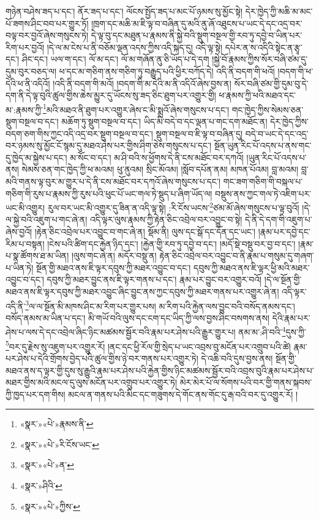 གཉེན་བཤེས་ཟད་པ་དང་། ནོར་ཟད་པ་དང་། ལོངས་སྤྱོད་ཟད་པ་མང་པོ་ཉམས་སུ་མྱོང་སྟེ། དེར་ཁྱེད་ཀྱི་མཆི་མ་མང་པོ་ཟགས་ཤིང་བབ་པར་གྱུར་ཏོ། །ཁྲག་དང་མཆི་མ་ཇི་ལྟ་བ་བཞིན་དུ་མའི་ནུ་ཞོ་འཐུངས་པ་ཡང་དེ་དང་འདྲ་བར་བལྟ་བར་བྱའོ་ཞེས་གསུངས་ཏེ། དེ་ལྟ་བུ་དང་མཐུན་པ་རྣམས་ནི་སྐྱེ་བའི་སྡུག་བསྔལ་གྱི་རབ་ཏུ་དབྱེ་བ་ཡིན་པར་རིག་པར་བྱའོ། །དེ་ལ་མ་ངེས་པ་ནི་བཅོམ་ལྡན་འདས་ཀྱིས་འདི་སྐད་དུ། འདི་ལྟ་སྟེ། དཔེར་ན་ས་འདིའི་སྟེང་ན་རྩྭ་དང་། ཤིང་དང་། ཡལ་ག་དང་། ལོ་མ་དང་། ལོ་མ་གཞོན་ནུ་ཅི་ཡོད་པ་དེ་དག །སྐྱེ་བོ་རྣམས་ཀྱིས་སོར་བཞི་ཙམ་དུ་དུམ་བུར་བཅད་ལ། ཕ་དང་མ་གཅིག་ནས་གཅིག་ཏུ་བརྒྱུད་པའི་ཕྱིར་བཀོད་དེ། འདི་ནི་བདག་གི་ཕའོ། །བདག་གི་ཕ་དེའི་ཕ་ནི་འདིའོ། །འདི་ནི་བདག་གི་མའོ། །བདག་གི་མ་དེའི་མ་ནི་འདིའོ་ཞེས་བྱས་ན། སོར་བཞི་ཙམ་གྱི་དུམ་བུ་དེ་དག་ནི་དེ་ལྟ་བུའི་ཚུལ་གྱིས་ཆེས་མྱུར་དུ་ཡོངས་སུ་ཟད་ཅིང་ཐུག་པར་འགྱུར་གྱི། ཕ་རྣམས་ཀྱི་ཕའི་མཐའ་དང་མ་:རྣམས་ཀྱི་\footnote{«སྣར་»«པེ་»རྣམས་ནི་}མའི་མཐའ་ནི་ཐུག་པར་འགྱུར་ཞེས་ང་མི་སྨྲའོ་ཞེས་གསུངས་པ་དང་། གང་ཁྱེད་ཀྱིས་སེམས་ཅན་སྡུག་བསྔལ་བ་དང་། མཆོག་ཏུ་སྡུག་བསྔལ་བ་དང་། ཡིད་མི་བདེ་བ་དང་ལྡན་པ་གང་དག་མཐོང་ན། དེར་ཁྱེད་ཀྱིས་བདག་ཅག་གིས་ཀྱང་འདི་འདྲ་བར་སྡུག་བསྔལ་བ་དང་། སྡུག་བསྔལ་བ་ཇི་ལྟ་བ་བཞིན་དུ། བདེ་བ་ཡང་དེ་དང་འདྲ་བར་ཉམས་སུ་མྱོང་ངོ་སྙམ་དུ་མཐའ་ཤེས་པར་གྱིས་ཤིག་ཅེས་གསུངས་པ་དང་། སྔོན་ཡུན་རིང་པོ་འདས་པ་ནས་གང་དུ་ཁྱེད་མ་སྐྱེས་པ་དང་། མ་སོང་བ་དང་། མ་ཤི་བའི་ས་ཕྱོགས་དེ་ནི་ངས་མཐོང་བར་དཀའོ། །ཡུན་རིང་པོ་འདས་པ་ནས། སེམས་ཅན་གང་ཁྱེད་ཀྱི་ཕ་མའམ། ཕུ་ནུའམ། སྲིང་མོའམ། །སློབ་དཔོན་ནམ། མཁན་པོའམ། བླ་མའམ། བླ་མའི་གནས་ལྟ་བུར་མ་གྱུར་པ་དེ་ནི་ངས་མཐོང་བར་དཀའོ་ཞེས་གསུངས་པ་དང་། གང་ཟག་གཅིག་གི་བསྐལ་པ་གཅིག་གི་རུས་པ་རྣམས་ཀྱི་རུས་པའི་ཕུང་པོ་ཡང་གལ་ཏེ་སྡུད་པ་ཞིག་ཡོད་ལ། བསྡུས་ནས་ཀྱང་གལ་ཏེ་འཇིག་པར་ཡང་མི་འགྱུར། རུལ་བར་ཡང་མི་འགྱུར་དུ་ཟིན་ན་འདི་ལྟ་སྟེ། :རི་ངོས་ཡངས་\footnote{«སྣར་»«པེ་»རི་ངོས་ཡང་}ཙམ་མོ་ཞེས་གསུངས་པ་ལྟ་བུའོ། །དེ་ལ་སྐྱེ་བའི་འཇུག་པ་གང་ཞེ་ན། འདི་ལྟར་ལུས་རྣམས་ཀྱི་རྟེན་ཅིང་འབྲེལ་བར་འབྱུང་བ་སྟེ། དེ་ནི་དེ་དག་གི་འཇུག་པ་ཞེས་བྱའོ། །རྟེན་ཅིང་འབྲེལ་པར་འབྱུང་བ་གང་ཞེ་ན། སྡོམ་ནི། ལུས་དང་སྒོ་དང་དོན་དང་ཡང་། །རྣམ་པར་དབྱེ་དང་རིམ་པ་བསྟན། །ངེས་པའི་ཚིག་དང་རྐྱེན་ཉིད་དང་། །རྐྱེན་གྱི་རབ་ཏུ་དབྱེ་བ་དང་། །མདོ་སྡེ་བསྡུ་བར་བྱ་བ་དང་། །རྣམ་པ་སྣ་ཚོགས་ཐ་མ་ཡིན། །ལུས་གང་ཞེ་ན། མདོར་བསྡུ་ན། རྟེན་ཅིང་འབྲེལ་བར་འབྱུང་བ་ནི་རྣམ་པ་གསུམ་དུ་གཞག་པ་ཡིན་ཏེ། སྔོན་གྱི་མཐའ་ནས་ཇི་ལྟར་དབུས་ཀྱི་མཐར་འབྱུང་བ་དང་། དབུས་ཀྱི་མཐའ་ནས་ཇི་ལྟར་ཕྱི་མའི་མཐར་འབྱུང་བ་དང་། དབུས་ཀྱི་མཐར་བྱུང་ནས་ཇི་ལྟར་གནས་པ་དང་། རྣམ་པར་བྱུང་བར་འགྱུར་བའོ། །དེ་ལ་སྔོན་གྱི་མཐའ་ནས་ཇི་ལྟར་དབུས་ཀྱི་མཐར་འབྱུང་ཞིང་བྱུང་ནས་ཀྱང་དབུས་ཀྱི་མཐར་གནས་པར་འགྱུར་ཞེ་ན། འདི་ལྟར་འདི་ནི་\footnote{«སྣར་»«པེ་»ན་}ལ་ལ་སྔོན་མི་མཁས་ཤིང་མ་རིག་པར་གྱུར་པས། མ་རིག་པའི་རྐྱེན་ལས་བྱུང་བའི་བསོད་ནམས་དང་། བསོད་ནམས་མ་ཡིན་པ་དང་། མི་གཡོ་བའི་ལུས་དང་ངག་དང་ཡིད་ཀྱི་ལས་བྱས་ཤིང་བསགས་ནས། དེའི་རྣམ་པར་ཤེས་པ་ལས་དེ་དང་འབྲེལ་ཞིང་ཉིང་མཚམས་སྦྱོར་བའི་རྣམ་པར་ཤེས་པའི་རྒྱུར་གྱུར་པ། ནམ་མ་:ཤི་བའི་\footnote{«སྣར་»ཤིའི་}དུས་ཀྱི་\footnote{«སྣར་»«པེ་»ཀྱིས་}བར་དུ་རྗེས་སུ་འཇུག་པར་འགྱུར་རོ། །ནང་དང་ཕྱི་རོལ་གྱི་སྲེད་པ་ཡང་འབྲས་བུ་མངོན་པར་འགྲུབ་པའི་ཚེ། རྣམ་པར་ཤེས་པ་དེའི་གྲོགས་བྱེད་པའི་ཚུལ་གྱིས་ཉེ་བར་གནས་པར་འགྱུར་ཏེ། དེ་འཆི་བའི་དུས་བྱས་ནས། སྔོན་གྱི་མཐའ་ནས་ད་ལྟར་གྱི་དུས་སུ་རྒྱུའི་རྣམ་པར་ཤེས་པའི་རྐྱེན་གྱིས་ཉིང་མཚམས་སྦྱོར་བའི་འབྲས་བུའི་རྣམ་པར་ཤེས་པ་མཐར་གྱིས་མའི་མངལ་དུ་ལུས་མངོན་པར་འགྲུབ་པར་འགྱུར་ཏེ། མེར་མེར་པོ་ལ་སོགས་པའི་བར་གྱི་གནས་སྐབས་ཀྱི་ཁྱད་པར་དག་གིས། མངལ་ན་གནས་པའི་མིང་དང་གཟུགས་དེ་གོང་ནས་གོང་དུ་རྒ་བའི་བར་དུ་འགྱུར་རོ། །

